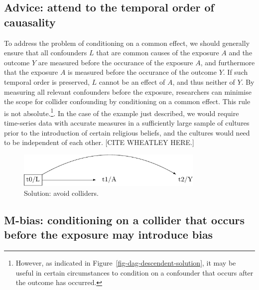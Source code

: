 \documentclass[
  singlecolumn]{report}
\begin{document}
\hypertarget{advice-attend-to-the-temporal-order-of-cauasality-1}{%
\subsection{Advice: attend to the temporal order of
cauasality}\label{advice-attend-to-the-temporal-order-of-cauasality-1}}

To address the problem of conditioning on a common effect, we should
generally ensure that all confounders \(L\) that are common causes of
the exposure \(A\) and the outcome \(Y\) are measured before the
occurance of the exposure \(A\), and furthermore that the exposure \(A\)
is measured before the occurance of the outcome \(Y\). If such temporal
order is preserved, \(L\) cannot be an effect of \(A\), and thus neither
of \(Y\). By measuring all relevant confounders before the exposure,
researchers can minimise the scope for collider confounding by
conditioning on a common effect. This rule is not absolute.\footnote{However,
  as indicated in Figure~\ref{fig-dag-descendent-solution}, it may be
  useful in certain circumstances to condition on a confounder that
  occurs after the outcome has occurred.}. In the case of the example
just described, we would require time-series data with accurate measures
in a sufficiently large sample of cultures prior to the introduction of
certain religious beliefs, and the cultures would need to be independent
of each other. {[}CITE WHEATLEY HERE.{]}

\begin{figure}

{\centering \includegraphics[width=0.8\textwidth,height=\textheight]{causal-dags_files/figure-pdf/fig-dag-common-effect-solution-1.pdf}

}

\caption{\label{fig-dag-common-effect-solution}Solution: avoid
colliders.}

\end{figure}

\hypertarget{m-bias-conditioning-on-a-collider-that-occurs-before-the-exposure-may-introduce-bias}{%
\subsection{M-bias: conditioning on a collider that occurs before the
exposure may introduce
bias}\label{m-bias-conditioning-on-a-collider-that-occurs-before-the-exposure-may-introduce-bias}}
\end{document}
